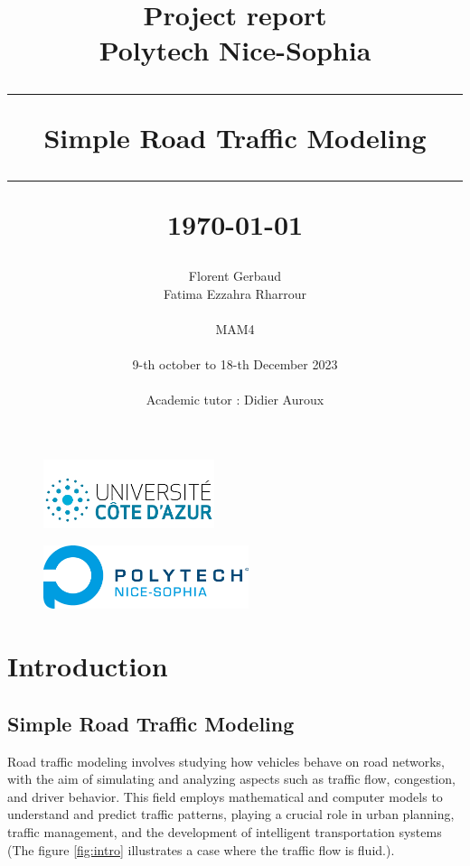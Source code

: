 \documentclass{article}
\title{\textbf{\Huge Project report}\\[1cm]
	\textbf{\LARGE Polytech Nice-Sophia}\\[2cm]
	\hrule height 1pt
	\vspace{0.5cm}
	\textbf{\Large Simple Road Traffic Modeling}\\[0.5cm]
	\hrule height 1pt
	\vspace{3cm}
	\small{\today{}}}
\author{
	\begin{tabular}{c}
		Florent Gerbaud \\ Fatima Ezzahra Rharrour \\ \\
  MAM4
  \\ \\
		9-th october to 18-th December 2023\\
		\\ Academic tutor : Didier Auroux
	\end{tabular}
}
\date{}
\begin{document}
	\maketitle
	\hspace{2cm}
	\begin{figure}[b]
		\centering
		\begin{minipage}[b]{0.45\linewidth}
			\includegraphics[width=5cm]{logo.png} \\
		\end{minipage}
		\hfill
		\begin{minipage}[b]{0.45\linewidth}
			\raggedleft
			\vspace{-0.5cm}
			\includegraphics[width=6cm]{Polytech.png} \\
		\end{minipage}
	\end{figure}
	\newpage %
	\renewcommand{\contentsname}{
		\hfill
		\begin{tikzpicture}
			\node[draw, fill=white, inner sep=20pt,line width=1.5pt] {\fontsize{30}{36}\selectfont\bfseries Table of Contents};
		\end{tikzpicture}
		\hfill
	}
	\tableofcontents
	\newpage
	\listoffigures %
	
	\listofalgorithms
	\newpage
	\section{Introduction}
	\subsection{Simple Road Traffic Modeling}
	
		Road traffic modeling involves studying how vehicles behave on road networks, with the aim of simulating and analyzing aspects such as traffic flow, congestion, and driver behavior. This field employs mathematical and computer models to understand and predict traffic patterns, playing a crucial role in urban planning, traffic management, and the development of intelligent transportation systems (The figure \ref{fig:intro} illustrates a case where the traffic flow is fluid.). 
		
\end{document}

